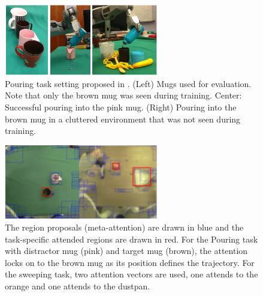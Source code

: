 \begin{figure}[t]
    \centering
    \includegraphics[width=0.6\textwidth]{figures/images/deep_object_centric_representation/pouring_task.png}
    \caption{Pouring task setting proposed in \cite{devin2018deep}. (Left) Mugs used for evaluation. Note that only the brown mug was seen during training. Center: Successful pouring into the pink mug. (Right) Pouring into the brown mug in a cluttered environment that was not seen during training.}
    \label{fig:pouring_task_setting}
\end{figure}

\begin{figure}[t]
    \centering
    \includegraphics[width=0.6\textwidth]{figures/images/deep_object_centric_representation/mugs_distractors.png}
        \caption{The region proposals (meta-attention) are drawn in blue and the task-specific attended regions are drawn in red. For the Pouring task with distractor mug (pink) and target mug (brown), the attention locks on to the brown mug as its position defines the trajectory. For the sweeping task, two attention vectors are used, one attends to the orange and one attends to the dustpan.}
    \label{fig:task_specific_attention}
\end{figure}